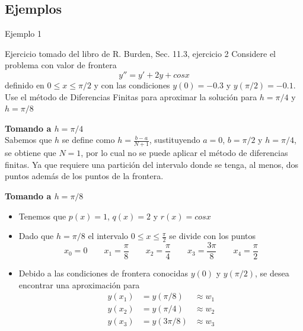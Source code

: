 \subsection{Ejemplos}
\begin{frame}{Ejemplo 1}
\begin{block}{Ejercicio tomado del libro de R. Burden, Sec. 11.3, ejercicio 2}
Considere el problema con valor de frontera
$$y''=y'+2y+cos x$$
definido en $0\leq x \leq \pi/2$ y con las condiciones $y(0)=-0.3$ y $y(\pi/2)=-0.1$. Use el método de Diferencias Finitas para aproximar la solución para $h=\pi/4$ y $h=\pi/8$ 
\end{block}
\vspace{0.7cm}
\textbf{Tomando a $h=\pi/4$}\\

Sabemos que $h$ se define como $h=\frac{b-a}{N+1}$, sustituyendo $a=0$, $b=\pi/2$ y $h=\pi/4$, se obtiene que $N=1$, por lo cual no se puede aplicar el método de diferencias finitas. Ya que requiere una partición del intervalo donde se tenga, al menos, dos puntos además de los puntos de la frontera.
\end{frame}

\begin{frame}
\textbf{Tomando a $h=\pi/8$}\\
\begin{itemize}
\item Tenemos que $p(x)=1$, $q(x)=2$ y $r(x)=cos x$
\item Dado que $h=\pi/8$ el intervalo $0\leq x \leq \frac{\pi}{2}$ se divide con los puntos
$$x_0=0 \qquad x_1=\frac{\pi}{8} \qquad x_2=\frac{\pi}{4} \qquad x_3=\frac{3\pi}{8} \qquad x_4=\frac{\pi}{2}$$
\item Debido a las condiciones de frontera conocidas $y(0)$ y $y(\pi/2)$, se desea encontrar una aproximación para  \begin{displaymath}
\begin{array}{rlr}
y(x_1)&=y(\pi/8)&\approx w_1\\
y(x_2)&=y(\pi/4)&\approx w_2\\
y(x_3)&=y(3\pi/8)&\approx w_3
\end{array}
\end{displaymath}
\end{itemize}
\end{frame}

